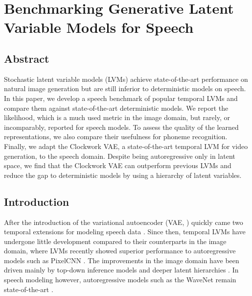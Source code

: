 
\chapter[benchmarking generative latent variable models for speech]{Benchmarking Generative Latent Variable Models for Speech}
\label{chp:benchmarking}


\section{Abstract}
Stochastic latent variable models (LVMs) achieve state-of-the-art performance on natural image generation but are still inferior to deterministic models on speech. In this paper, we develop a speech benchmark of popular temporal LVMs and compare them against state-of-the-art deterministic models. We report the likelihood, which is a much used metric in the image domain, but rarely, or incomparably, reported for speech models. To assess the quality of the learned representations, we also compare their usefulness for phoneme recognition. Finally, we adapt the Clockwork VAE, a state-of-the-art temporal LVM for video generation, to the speech domain. Despite being autoregressive only in latent space, we find that the Clockwork VAE can outperform previous LVMs and reduce the gap to deterministic models by using a hierarchy of latent variables.


\section{Introduction}
After the introduction of the variational autoencoder (VAE,  \textcite{kingma_autoencoding_2014, rezende_stochastic_2014}) quickly came two temporal extensions for modeling speech data \cite{chung_recurrent_2015, fraccaro_sequential_2016}. Since then, temporal LVMs have undergone little development compared to their counterparts in the image domain, where LVMs recently showed superior performance to autoregressive models such as PixelCNN \cite{oord_pixel_2016, oord_conditional_2016, salimans_pixelcnn_2017}. The improvements in the image domain have been driven mainly by top-down inference models and deeper latent hierarchies \cite{sonderby_ladder_2016, maaloe_biva_2019, vahdat_nvae_2020, child_very_2021,sinha_consistency_2021,kingma_variational_2021}. In speech modeling however, autoregressive models such as the WaveNet remain state-of-the-art \cite{oord_wavenet_2016}.

